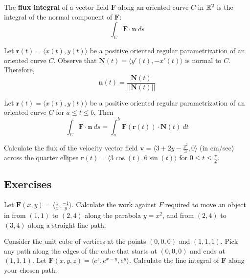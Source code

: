 \begin{theorem}
    The \textbf{flux integral} of a vector field $\bm{F}$ along an oriented curve $C$ in $\mathbb{R}^2$ is the integral of the normal component of $\bm{F}$:
    $$\int_C \bm{F} \cdot \bm{n} \ ds$$
    
    \end{theorem}

\begin{remark}
    Let $\bm{r}(t) = \langle x(t), y(t)\rangle$ be a positive oriented regular parametrization of an oriented curve $C$. Observe that $\bm{N}(t) = \langle y'(t), -x'(t) \rangle$ is normal to $C$.  Therefore,
    $$\bm{n}(t) = \frac{\bm{N}(t)}{||\bm{N}(t)||}$$
    \end{remark}

\begin{theorem}
    Let $\bm{r}(t) = \langle x(t), y(t)\rangle$ be a positive oriented regular parametrization of an oriented curve $C$ for $a \leq t \leq b$.  Then
    $$\int_C \bm{F} \cdot \bm{n} \ ds = \int_a^b \bm{F}(\bm{r}(t)) \cdot \bm{N}(t) \ dt$$
    
    \end{theorem}

\begin{example}
    Calculate the flux of the velocity vector field $\bm{v} = \langle 3+2y -\frac{y^2}{3}, 0 \rangle$ (in cm/sec) across the quarter ellipse $\bm{r}(t) = \langle 3\cos(t), 6\sin(t) \rangle$ for $0 \leq t \leq \frac{\pi}{2}$.
\end{example}



\subsection{Exercises}

\begin{problem}
    Let $\bm{F}(x,y) = \langle \frac{1}{x}, \frac{-1}{y} \rangle$.  Calculate the work against $F$ required to move an object in from $(1,1)$ to $(2,4)$ along the parabola $y=x^2$, and from $(2,4)$ to $(3,4)$ along a straight line path.
\end{problem}

\begin{problem}
    Consider the unit cube of vertices at the points $(0,0,0)$ and $(1,1,1)$.  Pick any path along the edges of the cube that starts at $(0,0,0)$ and ends at $(1,1,1)$.  Let $\bm{F}(x,y,z) = \langle e^z, e^{x-y}, e^y \rangle$.  Calculate the line integral of $\bm{F}$ along your chosen path.
\end{problem}

